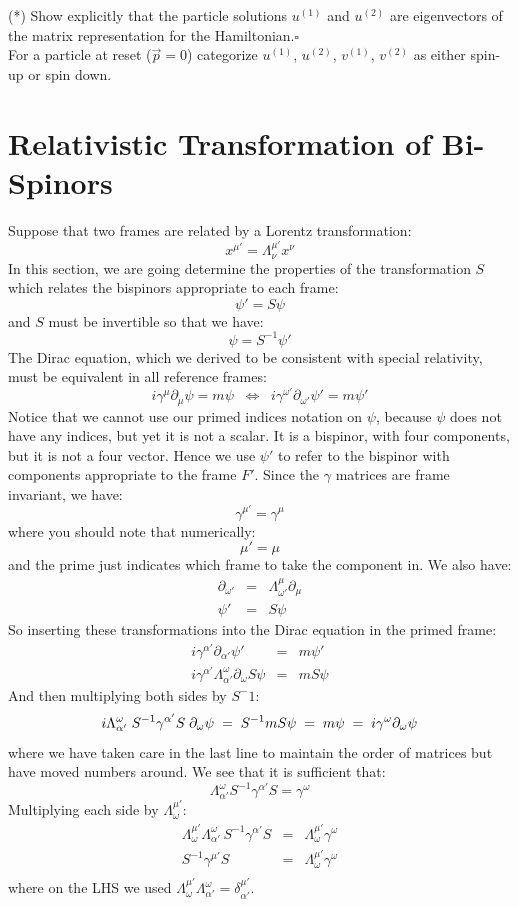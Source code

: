 \documentclass[12pt]{article}
\begin{document}
\exercise (*) Show explicitly that the particle solutions $u^{(1)}$ and $u^{(2)}$ are eigenvectors of the matrix representation for the Hamiltonian.$\square$\\[5pt]

\exercise For a particle at reset ($\vec{p}=0$) categorize $u^{(1)}$, $u^{(2)}$, $v^{(1)}$, $v^{(2)}$ as either spin-up or spin down.

\section{Relativistic Transformation of Bi-Spinors}
Suppose that two frames are related by a Lorentz transformation:
$$x^{\mu'} = \Lambda^{\mu'}_\nu x^\nu$$
In this section, we are going determine the properties of the transformation $S$ which relates the bispinors appropriate to each frame:
$$\psi' = S \psi$$
and $S$ must be invertible so that we have:
$$\psi = S^{-1} \psi'$$
The Dirac equation, which we derived to be consistent with special
relativity, must be equivalent in all reference frames:
$$i \gamma^\mu \partial_\mu \psi = m \psi \;\; \Leftrightarrow \;\;
i \gamma^{\omega'} \partial_{\omega'} \psi' = m \psi'$$
Notice that we cannot use our primed indices notation on $\psi$, because $\psi$ does not have any indices, but yet it is not a scalar.  It is a bispinor, with four components, but it is not a four vector.  Hence we use $\psi'$ to refer to the bispinor with components appropriate to the frame $F'$.
Since the $\gamma$ matrices are frame invariant, we have:
$$\gamma^{\mu'} =  \gamma^\mu$$
where you should note that numerically:
$$\mu' = \mu$$
and the prime just indicates which frame to take the component in.  We also have:
\begin{eqnarray*}
\partial_{\omega'} &=& \Lambda^\mu_{\omega'} \partial_\mu \\
\psi' &=& S \psi
\end{eqnarray*}
So inserting these transformations into the Dirac equation in the primed frame:
\begin{eqnarray*}
  i \gamma^{\alpha'} \partial_{\alpha'} \psi' &=& m \psi'\\
  i \gamma^{\alpha'} \Lambda^\omega_{\alpha'} \partial_\omega S \psi
  &=& m S \psi
\end{eqnarray*}
And then multiplying both sides by $S^-1$:
$$
i \Lambda^\omega_{\alpha'} \; S^{-1} \gamma^{\alpha'} S  \; \partial_\omega \psi
\;=\;  S^{-1} m S \psi \;=\;  m \psi \;=\; i \gamma^\omega \partial_\omega \psi \\
$$
where we have taken care in the last line to maintain the order of matrices but have moved numbers around.  We see that it is sufficient that:
$$\Lambda^\omega_{\alpha'} S^{-1} \gamma^{\alpha'} S = \gamma^\omega$$
Multiplying each side by $\Lambda^{\mu'}_\omega$:
\begin{eqnarray*}
\Lambda^{\mu'}_{\omega} \Lambda^{\omega}_{\alpha'} \, S^{-1} \gamma^{\alpha'} S &=& \Lambda^{\mu'}_\omega \gamma^\omega \\
S^{-1} \gamma^{\mu'} S &=& \Lambda^{\mu'}_\omega \gamma^\omega \\
\end{eqnarray*}
where on the LHS we used $\Lambda^{\mu'}_{\omega} \Lambda^{\omega}_{\alpha'} = \delta^{\mu'}_{\alpha'}$.
\end{document}
